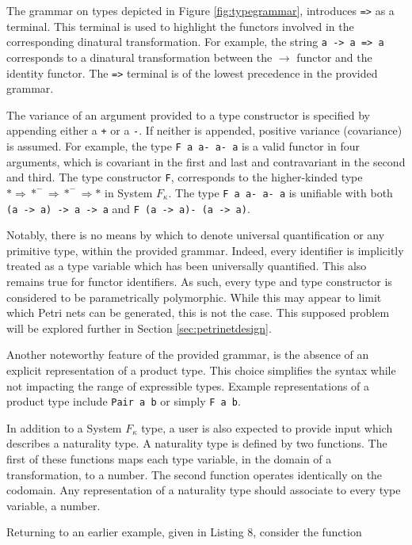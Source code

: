 \documentclass[../Dissertation.tex]{subfiles}
\begin{document}
The grammar on types depicted in Figure \ref{fig:typegrammar}, introduces \lstinline{=>} as a terminal. This terminal is used to highlight the functors involved in the corresponding dinatural transformation. For example, the string \lstinline{a -> a => a} corresponds to a dinatural transformation between the $\rightarrow$ functor and the identity functor. The \lstinline{=>} terminal is of the lowest precedence in the provided grammar.
\par
The variance of an argument provided to a type constructor is specified by appending either a \lstinline{+} or a \lstinline{-}. If neither is appended, positive variance (covariance) is assumed. For example, the type \lstinline{F a a- a- a} is a valid functor in four arguments, which is covariant in the first and last and contravariant in the second and third. The type constructor \lstinline{F}, corresponds to the higher-kinded type $* \Rightarrow *^- \Rightarrow *^- \Rightarrow *$ in System $F_\kappa$. The type \lstinline{F a a- a- a} is unifiable with both \lstinline{(a -> a) -> a -> a} and \lstinline{F (a -> a)- (a -> a)}.
\par
Notably, there is no means by which to denote universal quantification or any primitive type, within the provided grammar. Indeed, every identifier is implicitly treated as a type variable which has been universally quantified. This also remains true for functor identifiers. As such, every type and type constructor is considered to be parametrically polymorphic. While this may appear to limit which Petri nets can be generated, this is not the case. This supposed problem will be explored further in Section \ref{sec:petrinetdesign}.
\par
Another noteworthy feature of the provided grammar, is the absence of an explicit representation of a product type. This choice simplifies the syntax while not impacting the range of expressible types. Example representations of a product type include \lstinline{Pair a b} or simply \lstinline{F a b}. 
\par
In addition to a System $F_\kappa$ type, a user is also expected to provide input which describes a naturality type. A naturality type is defined by two  functions. The first of these functions maps each type variable, in the domain of a transformation, to a number. The second function operates identically on the codomain. Any representation of a naturality type should associate to every type variable, a number.
\par
Returning to an earlier example, given in Listing 8, consider the function
\end{document}
